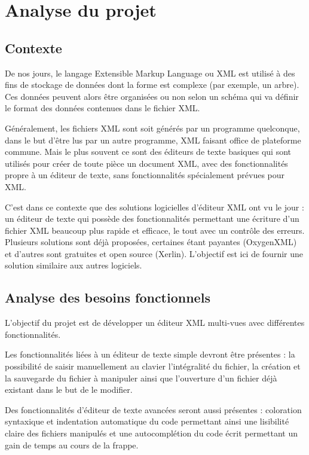 \chapter{Analyse du projet}
	\section{Contexte}
	De nos jours, le langage Extensible Markup Language ou XML est utilisé à des fins de stockage de données dont la forme est complexe (par exemple, un arbre). Ces données peuvent alors être organisées ou non selon un schéma qui va définir le format des données contenues dans le fichier XML.
	
	Généralement, les fichiers XML sont soit générés par un programme quelconque, dans le but d'être lus par un autre programme, XML faisant office de plateforme commune. Mais le plus souvent ce sont des éditeurs de texte basiques qui sont utilisés pour créer de toute pièce un document XML, avec des fonctionnalités propre à un éditeur de texte, sans fonctionnalités spécialement prévues pour XML.
	
	C'est dans ce contexte que des solutions logicielles d'éditeur XML ont vu le jour : un éditeur de texte qui possède des fonctionnalités permettant une écriture d'un fichier XML beaucoup plus rapide et efficace, le tout avec un contrôle des erreurs. Plusieurs solutions sont déjà proposées, certaines étant payantes (OxygenXML) et d'autres sont gratuites et open source (Xerlin). L'objectif est ici de fournir une solution similaire aux autres logiciels.
	
	\section{Analyse des besoins fonctionnels}
	L'objectif du projet est de développer un éditeur XML multi-vues avec différentes fonctionnalités.
	
	Les fonctionnalités liées à un éditeur de texte simple devront être présentes : la possibilité de saisir manuellement au clavier l'intégralité du fichier, la création et la sauvegarde du fichier à manipuler ainsi que l'ouverture d'un fichier déjà existant dans le but de le modifier.
	
	Des fonctionnalités d'éditeur de texte avancées seront aussi présentes : coloration syntaxique et indentation automatique du code permettant ainsi une lisibilité claire des fichiers manipulés et une autocomplétion du code écrit permettant un gain de temps au cours de la frappe.

